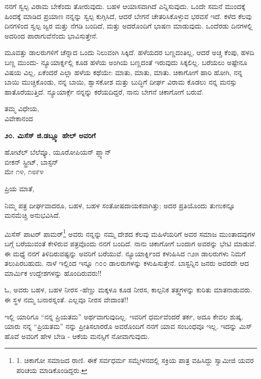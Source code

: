 ನನಗೆ ಸ್ವಲ್ಪ ವಿರಾಮ ಬೇಕೆಂದು ತೋರುವುದು. ಬಹಳ ಆಯಾಸವಾಗಿದೆ ಎನ್ನಿಸುವುದು. ಒಂದೇ ಸಮನೆ ಮುಂದಕ್ಕೆ ಹಿಂದಕ್ಕೆ ಮಾಡಿದ ಪ್ರಯಾಣ ನನ್ನನ್ನು ಸ್ವಲ್ಪ ಕುಗ್ಗಿಸಿದೆ, ಆದರೆ ಬೇಗನೆ ಚೇತರಿಸಿಕೊಳ್ಳುವ ಭರವಸೆ ಇದೆ. ಕಳೆದ ಕೆಲವು ದಿನಗಳಿಂದ ಸ್ವಲ್ಪ ಜ್ವರ ಮತ್ತು ನೆಗಡಿ ಬಂದಿದೆ, ಮತ್ತು ಅದರೊಂದಿಗೆ ಭಾಷಣ ಮಾಡುವುದು. ಒಂದೆರಡು ದಿನಗಳಲ್ಲಿ ಅದರಿಂದ ಪಾರಾಗುವೆನೆಂದು ಭಾವಿಸುತ್ತೇನೆ.

ಮೂವತ್ತು ಡಾಲರುಗಳಿಗೆ ಚೆನ್ನಾದ ಒಂದು ನಿಲುವಂಗಿ ಸಿಕ್ಕಿದೆ. ಹಳೆಯದರ ಬಣ್ಣದಂತಿಲ್ಲ, ಆದರೆ ಅಚ್ಚ ಕೆಂಪು, ಹಳದಿ ಬಣ್ಣ ಮುಂದು- ನ್ಯೂಯಾರ್ಕ್ನಲ್ಲಿ ಕೂಡ ಹಳೆಯ ಅಂಗಿಯ ಬಣ್ಣದಂತೆ ಇರುವುದು ಸಿಕ್ಕಲಿಲ್ಲ. ಬರೆಯಲು ಅಷ್ಟೇನೂ ವಿಷಯ ವಿಲ್ಲ, ಏಕೆಂದರೆ ಎಲ್ಲಾ ಹಳೆಯ ಕಥೆಯೇ: ಮಾತು, ಮಾತು, ಮಾತು. ಚಿಕಾಗೋಗೆ ಹಾರಿ ಹೋಗಿ, ನನ್ನ ಬಾಯಿ ಮುಚ್ಚಿಕೊಂಡು, ನನ್ನ ಬಾಯಿ, ಶ್ವಾಸಕೋಶ ಮತ್ತು ಬುದ್ಧಿಗೆ ದೀರ್ಘ ವಿರಾಮ ಕೊಡಲು ನನ್ನ ಮನಸ್ಸು ಹಾತೊರೆಯುತ್ತಿದೆ. ನ್ಯೂಯಾರ್ಕ್ಗೆ ನನ್ನನ್ನು ಕರೆಯದಿದ್ದರೆ, ನಾನು ಬೇಗನೆ ಚಿಕಾಗೋಗೆ ಬರುವೆ.

\begin{flushright}
ತಮ್ಮ ವಿಧೇಯ,\\ವಿವೇಕಾನಂದ
\end{flushright}

\begin{center}
\textbf{೨೦. ಮಿಸೆಸ್ ಜಿ.ಡಬ್ಲ್ಯೂ ಹೇಲ್ ಅವರಿಗೆ}
\end{center}

\begin{flushright}
ಹೋಟೆಲ್ ಬೆಲೆವ್ಯೂ, ಯೂರೋಪಿಯನ್ ಪ್ಲ್ಯಾನ್\\ಬೀಕನ್ ಸ್ಟ್ರೀಟ್, ಬಾಸ್ಟನ್\\ಮೇ ೧೪, ೧೮೯೪
\end{flushright}

ಪ್ರಿಯ ಮಾತೆ,

ನಿಮ್ಮ ಪತ್ರ ದೀರ್ಘವಾದರೂ, ಬಹಳ, ಬಹಳ ಸಂತೋಷದಾಯಕವಾಗಿತ್ತು; ಅದರ ಪ್ರತಿಯೊಂದು ತುಣುಕನ್ನೂ ಮನಮೆಚ್ಚಿ ಅನುಭವಿಸಿದೆ.

ಮಿಸೆಸ್ ಪಾಟರ್ ಪಾಮರ್\footnote{1. ಚಿಕಾಗೋ ಸಮಾಜದ ರಾಣಿ. ಈಕೆ ಸರ್ವಧರ್ಮ ಸಮ್ಮೇಳನದಲ್ಲಿ ಸಕ್ರಿಯ ಪಾತ್ರ ವಹಿಸಿದ್ದು ಸ್ವಾಮೀಜಿ ಯವರ ಪರಿಚಯ ಮಾಡಿಕೊಂಡಿದ್ದರು.} ಅವರು ನನ್ನನ್ನು ನಮ್ಮ ದೇಶದ ಕೆಲವು ಮಹಿಳೆಯರಿಗೆ ಅವರ ಸಮಾಜ ಮುಂತಾದವುಗಳ ಬಗ್ಗೆ ಬರೆಯುವಂತೆ ಕೇಳಿರುವ ಪತ್ರವೊಂದು ನನಗೆ ಬಂದಿದೆ. ನಾನು ಚಿಕಾಗೋಗೆ ಬಂದಾಗ ಅವರನ್ನು ಭೇಟಿ ಮಾಡುವೆ. ಈ ಮಧ್ಯೆ ನನಗೆ ತಿಳಿದಿರುವಷ್ಟನ್ನು ಅವರಿಗೆ ಬರೆಯುವೆ. ನ್ಯೂಯಾರ್ಕ್ನಿಂದ ಕಳುಹಿಸಿದ ೧೨೫ ಡಾಲರುಗಳು ನಿಮಗೆ ತಲುಪಿರಬಹುದು. ನಾಳೆ ಇಲ್ಲಿಂದ ಇನ್ನೂ ೧೦೦ ಡಾಲರುಗಳನ್ನು ಕಳುಹಿಸುತ್ತೇನೆ. ಬಾಸ್ಟನ್ನಿನ ಜನರು ಅವರದೇ ಆದ ಮಾರ್ಮಿಕ ಉದ್ದೇಶಗಳನ್ನು ಹೊಂದಿರುವರು!!

ಓ, ಅವರು ಬಹಳ, ಬಹಳ ನೀರಸ -ಹೆಣ್ಣು ಮಕ್ಕಳೂ ಕೂಡ ನೀರಸ, ಕಾಲ್ಪನಿಕ ತತ್ತ್ವಗಳನ್ನು ಕುರಿತು ಮಾತನಾಡುವರು. ಈ ಸ್ಥಳ ನಮ್ಮ ಬನಾರಸ್ನಂತೆ. ಎಲ್ಲವೂ ನೀರಸ ವೇದಾಂತ!!

ಇಲ್ಲಿ ಯಾರಿಗೂ “ನನ್ನ ಪ್ರಿಯತಮ” ಅರ್ಥವಾಗುವುದಿಲ್ಲ. ಇವರಿಗೆ ಧರ್ಮವೆಂದರೆ ತರ್ಕ, ಅದೂ ಕೇವಲ ಶುಷ್ಕ. ಯಾರು ನನ್ನ “ಪ್ರಿಯತಮ” ನನ್ನು ಪ್ರೀತಿಸಲಾರರೊ ಅವರೊಂದಿಗೆ ನನಗೆ ಯಾವ ಸಂಬಂಧವೂ ಇಲ್ಲ. ಇದನ್ನು ಮಿಸ್ ಹೊವೆ ಅವರಿಗೆ ಹೇಳ ಬೇಡಿ - ಆಕೆಯ ಮನಸ್ಸಿಗೆ ನೋವಾಗುವುದು.

